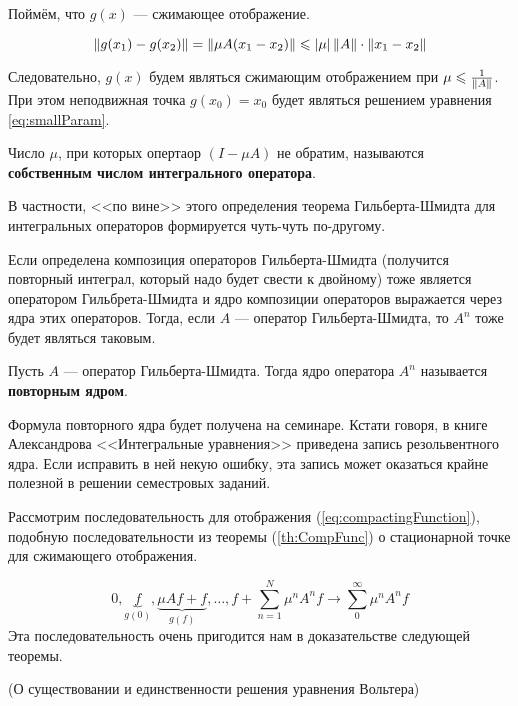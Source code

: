 \documentclass[12pt]{article}
\begin{document}
	Поймём, что $g(x)$ --- сжимающее отображение.
	
	$$\left\| g(x_1) - g(x_2) \right\| = \left\| \mu A(x_1 - x_2) \right\| \leqslant \left| \mu \right| \left\| A \right\| \cdot \left\| x_1 - x_2 \right\|$$
	
	Следовательно, $g(x)$ будем являться сжимающим отображением при $\mu \leqslant \frac{1}{\left\| A \right\|}$. При этом
	неподвижная точка $g(x_0) = x_0$ будет являться решением уравнения \ref{eq:smallParam}.
	
	\begin{defi}
		Число $\mu$, при которых опертаор $(I - \mu A)$ не обратим, называются \textbf{собственным числом
		интегрального оператора}.
	\end{defi}
	
	В частности, <<по вине>> этого определения теорема Гильберта-Шмидта для интегральных операторов формируется
	чуть-чуть по-другому.
	
	Если определена композиция операторов Гильберта-Шмидта (получится повторный интеграл, который надо будет 
	свести к двойному) тоже является оператором Гильбрета-Шмидта и ядро композиции операторов выражается 
	через ядра этих операторов. Тогда, если $A$ --- оператор Гильберта-Шмидта, то $A^n$ тоже будет являться
	таковым.
	
	\begin{defi}
		Пусть $A$ --- оператор Гильберта-Шмидта. Тогда ядро оператора $A^n$ называется \textbf{повторным ядром}.
	\end{defi}
	
	{\footnotesize
	Формула повторного ядра будет получена на семинаре. Кстати говоря, в книге Александрова <<Интегральные уравнения>>
	приведена запись резольвентного ядра. Если исправить в ней некую ошибку, эта запись может оказаться крайне полезной
	в решении семестровых заданий.\par
	}
	
	Рассмотрим последовательность для отображения (\ref{eq:compactingFunction}), подобную последовательности
	из теоремы (\ref{th:CompFunc}) о стационарной точке для сжимающего отображения.
	
	$$0, \underbrace{f}_{g(0)}, \underbrace{\mu Af + f}_{g(f)}, \ldots, f + \sum_{n=1}^N \mu^nA^nf \rightarrow \sum_0^{\infty} \mu^nA^n f$$
	Эта последовательность очень пригодится нам в доказательстве следующей теоремы.	
	
	\begin{theorem}
		(О существовании и единственности решения уравнения Вольтера)
	\end{theorem}		
\end{document}
